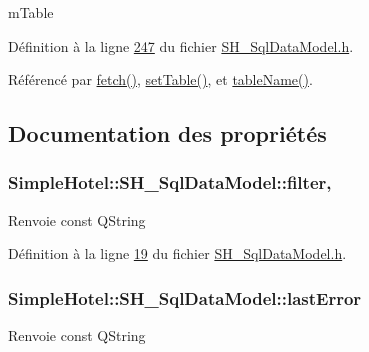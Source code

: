 m\-Table 



Définition à la ligne \hyperlink{SH__SqlDataModel_8h_source_l00247}{247} du fichier \hyperlink{SH__SqlDataModel_8h_source}{S\-H\-\_\-\-Sql\-Data\-Model.\-h}.



Référencé par \hyperlink{classSimpleHotel_1_1SH__SqlDataModel_ab8b74a08f668025c11c5446d4e4b469b}{fetch()}, \hyperlink{classSimpleHotel_1_1SH__SqlDataModel_ace12600fa4540dbff661d80318a81d04}{set\-Table()}, et \hyperlink{classSimpleHotel_1_1SH__SqlDataModel_a9228179700c32feac1ec5a495ca36f9f}{table\-Name()}.



\subsection{Documentation des propriétés}
\hypertarget{classSimpleHotel_1_1SH__SqlDataModel_ae7c93067c3e3fbbff663a407d4e8e4b4}{
\subsubsection[{filter}]{\setlength{\rightskip}{0pt plus 5cm}Simple\-Hotel\-::\-S\-H\-\_\-\-Sql\-Data\-Model\-::filter\hspace{0.3cm}{\ttfamily [read]}, {\ttfamily [write]}}}\label{classSimpleHotel_1_1SH__SqlDataModel_ae7c93067c3e3fbbff663a407d4e8e4b4}
\begin{DoxyReturn}{Renvoie}
const Q\-String 
\end{DoxyReturn}


Définition à la ligne \hyperlink{SH__SqlDataModel_8h_source_l00019}{19} du fichier \hyperlink{SH__SqlDataModel_8h_source}{S\-H\-\_\-\-Sql\-Data\-Model.\-h}.

\hypertarget{classSimpleHotel_1_1SH__SqlDataModel_a5e015924c30fd496188d553ea5f84f93}{
\subsubsection[{last\-Error}]{\setlength{\rightskip}{0pt plus 5cm}Simple\-Hotel\-::\-S\-H\-\_\-\-Sql\-Data\-Model\-::last\-Error\hspace{0.3cm}{\ttfamily [read]}}}\label{classSimpleHotel_1_1SH__SqlDataModel_a5e015924c30fd496188d553ea5f84f93}
\begin{DoxyReturn}{Renvoie}
const Q\-String 
\end{DoxyReturn}


